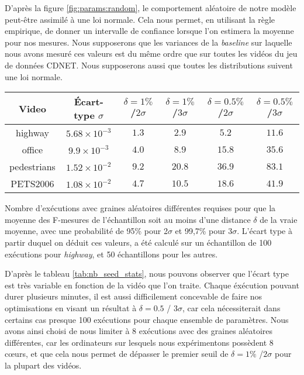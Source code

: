 	D'après la figure \ref{fig:params:random}, le comportement aléatoire de notre modèle peut-être assimilé à une loi normale. Cela nous permet, en utilisant la règle empirique, de donner un intervalle de confiance lorsque l'on estimera la moyenne pour nos mesures. Nous supposerons que les variances de la \textit{baseline} sur laquelle nous avons mesuré ces valeurs est du même ordre que sur toutes les vidéos du jeu de données CDNET. Nous supposerons aussi que toutes les distributions suivent une loi normale.

	\begin{tableth}
	\begin{tabular}{|c|c|cccc|}
		\hline
		Video	& Écart-type $\sigma$& $\delta=1\%$ /$2\sigma$ & $\delta=1\%$ /$3\sigma$ & $\delta=0.5\%$ /$2\sigma$ & $\delta=0.5\%$ /$3\sigma$\\
		\hline
		highway & $5.68 \times 10^{-3}$ & $1.3$ & $2.9$ & $5.2$ & $11.6$\\
		office & $9.9 \times 10^{-3}$ & $4.0$ & $8.9$ & $15.8$ & $35.6$\\
		pedestrians & $1.52 \times 10^{-2}$ & $9.2$ & $20.8$ & $36.9$ & $83.1$\\
		PETS2006 & $1.08 \times 10^{-2}$ & $4.7$ & $10.5$ & $18.6$ & $41.9$\\
		\hline
	\end{tabular}
	\caption[Estimations statistiques du nombre de graines requises]{Nombre d'exécutions avec graines aléatoires différentes requises pour que la moyenne des F-mesures de l'échantillon soit au moins d'une distance $\delta$ de la vraie moyenne, avec une probabilité de 95\% pour 2$\sigma$ et 99,7\% pour 3$\sigma$. L'écart type à partir duquel on déduit ces valeurs, a été calculé sur un échantillon de 100 exécutions pour \textit{highway}, et 50 échantillons pour les autres.} \label{tab:nb_seed_stats}
	\end{tableth}

	D'après le tableau \ref{tab:nb_seed_stats}, nous pouvons observer que l'écart type est très variable en fonction de la vidéo que l'on traite. Chaque éxécution pouvant durer plusieurs minutes, il est aussi difficilement concevable de faire nos optimisations en visant un résultat à $\delta = 0.5$ / $3\sigma$, car cela nécessiterait dans certains cas presque 100 exécutions pour chaque ensemble de paramètres. Nous avons ainsi choisi de nous limiter à 8 exécutions avec des graines aléatoires différentes, car les ordinateurs sur lesquels nous expérimentons possèdent 8 cœurs, et que cela nous permet de dépasser le premier seuil de $\delta=1\%$ /$2\sigma$ pour la plupart des vidéos.

